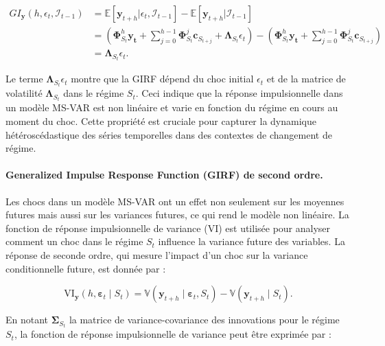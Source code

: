 \begin{sloppypar}
\begin{itemize}
\begin{equation}
\begin{split}
    GI_{\bm{y}}(h, \epsilon_t, \mathcal{I}_{t-1}) &= \mathbb{E}[\bm{y}_{t+h} | \epsilon_t, \mathcal{I}_{t-1}] - \mathbb{E}[\bm{y}_{t+h} | \mathcal{I}_{t-1}] \\
    &= \left( \bm{\Phi}^h_{S_t} \bm{y_{t}} + \sum_{j=0}^{h-1} \bm{\Phi}^j_{S_t} \bm{c}_{S_{t+j}} + \bm{\Lambda}_{S_t} \epsilon_t \right) - \left( \bm{\Phi}^h_{S_t} \bm{y_{t}} + \sum_{j=0}^{h-1} \bm{\Phi}^j_{S_t} \bm{c}_{S_{t+j}} \right) \\
    &= \bm{\Lambda}_{S_t} \epsilon_t.
\end{split}  
\end{equation}
\end{itemize}
Le terme $\bm{\Lambda}_{S_t} \epsilon_t$ montre que la GIRF dépend du choc initial $\epsilon_t$ et de la matrice de volatilité $\bm{\Lambda}_{S_t}$ dans le régime $S_t$. Ceci indique que la réponse impulsionnelle dans un modèle MS-VAR est non linéaire et varie en fonction du régime en cours au moment du choc. Cette propriété est cruciale pour capturer la dynamique hétéroscédastique des séries temporelles dans des contextes de changement de régime.

\paragraph{Generalized Impulse Response Function (GIRF) de second ordre.} Les chocs dans un modèle MS-VAR ont un effet non seulement sur les moyennes futures mais aussi sur les variances futures, ce qui rend le modèle non linéaire. La fonction de réponse impulsionnelle de variance (VI) est utilisée pour analyser comment un choc dans le régime \( S_t \) influence la variance future des variables. La réponse de seconde ordre, qui mesure l'impact d'un choc sur la variance conditionnelle future, est donnée par :

\begin{equation}
\text{VI}_{\bm{y}}(h, \bm{\varepsilon}_t \mid S_t) = \mathbb{V}(\bm{y}_{t+h} \mid \bm{\varepsilon}_t, S_t) - \mathbb{V}(\bm{y}_{t+h} \mid S_t). 
\end{equation}

En notant \( \bm{\Sigma}_{S_t} \) la matrice de variance-covariance des innovations pour le régime \( S_t \), la fonction de réponse impulsionnelle de variance peut être exprimée par :


\end{sloppypar}
